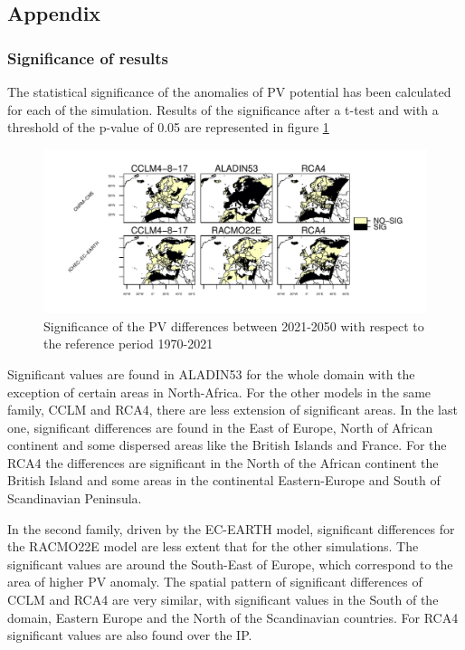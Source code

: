 \begin{subappendices}

  \section{Appendix}

  \subsubsection{Significance of results}

The statistical significance of the anomalies of PV potential has been calculated for each of the simulation. Results of the significance after a t-test and with a threshold of the p-value of 0.05 are represented in figure \ref{fig:pvalor}

\begin{figure}[h]
    \includegraphics[width=1\textwidth]{figs/capitulo7/pvalor.pdf}
    \caption{Significance of the PV differences between 2021-2050 with respect to the reference period 1970-2021}
\label{fig:pvalor}
\end{figure}

Significant values are found in ALADIN53 for the whole domain with the exception of certain areas in North-Africa. For the other models in the same family, CCLM and RCA4, there are less extension of significant areas. In the last one, significant differences are found in the East of Europe, North of African continent and some dispersed areas like the British Islands and France. For the RCA4 the differences are significant in the North of the African continent the British Island and some areas in the continental Eastern-Europe and South of Scandinavian Peninsula.

In the second family, driven by the EC-EARTH model, significant differences for the RACMO22E model are less extent that for the other simulations. The significant values are around the South-East of Europe, which correspond to the area of higher PV anomaly. The spatial pattern of significant differences of CCLM and RCA4 are very similar, with significant values in the South of the domain, Eastern Europe and the North of the Scandinavian countries. For RCA4 significant values are also found over the IP. 


\end{subappendices}
